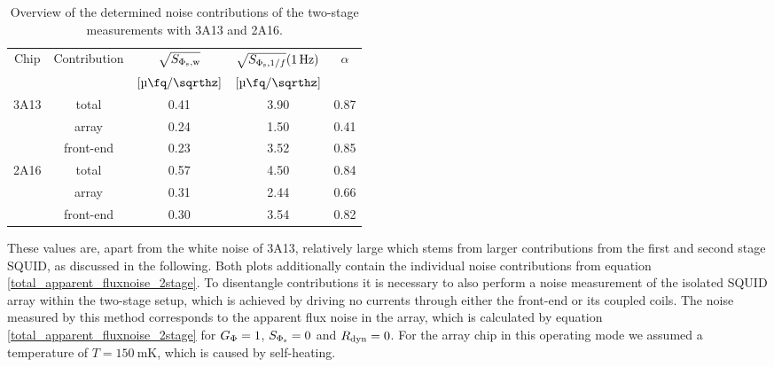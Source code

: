 \begin{table}[h!]
	\centering
	\begin{tabular}{c|c|*{3}{c}}
		Chip & Contribution & $\sqrt{S_{\rm \Phi_{\rm s},w}}$ & $\sqrt{S_{\Phi_{\rm s},1/f}}(\qty{1}{\Hz})$ & $\alpha$ \\
		& & $[\unit[per-mode=symbol]{\micro\fq\per\sqrthz}]$ & $[\unit[per-mode=symbol]{\micro\fq\per\sqrthz}]$ &   \\
		\midrule
		\multirow{3}{*}{3A13} & total & 0.41 & 3.90 & 0.87 \\
		& array & 0.24 & 1.50 & 0.41  \\
		& front-end & 0.23 & 3.52 & 0.85  \\
		\midrule
		\multirow{3}{*}{2A16} & total & 0.57 & 4.50 & 0.84  \\
		& array & 0.31 & 2.44 & 0.66  \\
		& front-end & 0.30 & 3.54 & 0.82  \\
	\end{tabular}
	\caption{Overview of the determined noise contributions of the two-stage measurements with 3A13 and 2A16.}
	\label{tab:noise2}
\end{table}
 
These values are, apart from the white noise of 3A13, relatively large which stems from larger contributions from the first and second stage SQUID, as discussed in the following. Both plots additionally contain the individual noise contributions from equation \ref{total_apparent_fluxnoise_2stage}. To disentangle contributions it is necessary to also perform a noise measurement of the isolated SQUID array within the two-stage setup, which is achieved by driving no currents through either the front-end or its coupled coils. The noise measured by this method corresponds to the apparent flux noise in the array, which is calculated by equation  \ref{total_apparent_fluxnoise_2stage} for $G_{\rm \Phi}=1$, $S_{\rm \Phi_s}=0$ and $R_{\rm dyn}=0$. For the array chip in this operating mode we assumed a temperature of $T=\qty{150}{\milli\kelvin}$, which is caused by self-heating.

